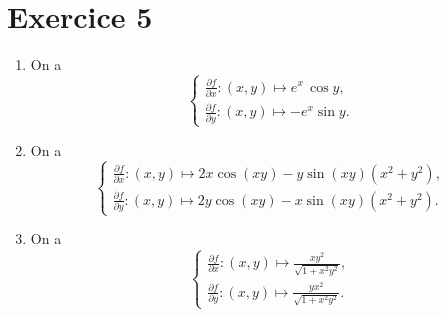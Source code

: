 \part{Exercice 5}

\begin{enumerate}
	\item On a \[
			\begin{cases}
				\frac{\partial f}{\partial x} : (x,y) \mapsto e^x\,\cos y,\\[3mm]
				\frac{\partial f}{\partial y} : (x,y) \mapsto -e^x \sin y.
			\end{cases}
		\]
	\item On a \[
			\begin{cases}
				\frac{\partial f}{\partial x} : (x,y) \mapsto 2x\cos(xy) - y\sin(xy)(x^2 + y^2),\\[3mm]
				\frac{\partial f}{\partial y} : (x,y) \mapsto 2y\cos(xy) - x\sin(xy)(x^2 + y^2).
			\end{cases}
		\] 
	\item On a \[
			\begin{cases}
				\frac{\partial f}{\partial x} : (x,y) \mapsto \frac{xy^2}{\sqrt{1 + x^2 y^2}},\\[3mm]
				\frac{\partial f}{\partial y} : (x,y) \mapsto \frac{yx^2}{\sqrt{1 + x^2 y^2}}.
			\end{cases}
		\] 
\end{enumerate}
